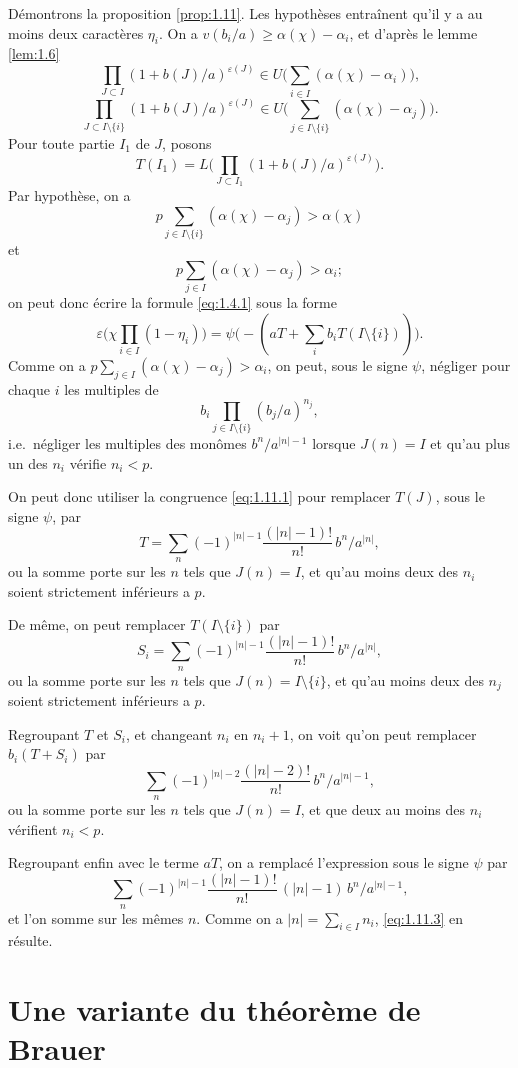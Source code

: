 \documentclass[12pt,a4paper]{article}
\theoremstyle{plain}
\theoremstyle{definition}
\theoremstyle{remark}
\begin{document}
D\'emontrons la proposition \ref{prop:1.11}. Les hypoth\`eses entra\^inent qu'il y a au moins deux caract\`eres $\eta_i$. On a $v(b_i/a) \geq \alpha(\chi) - \alpha_i$, et d'apr\`es le lemme \ref{lem:1.6}
\[
\prod_{J \subset I}(1+b(J)/a)^{\varepsilon(J)} \in U\biggl(\sum_{i \in I}(\alpha(\chi) - \alpha_i)\biggr),
\]
\[
\prod_{J \subset I \setminus \{i\}}(1+b(J)/a)^{\varepsilon(J)} \in U\biggl(\sum_{j \in I \setminus \{i\}}(\alpha(\chi) - \alpha_j)\biggr).
\]
Pour toute partie $I_1$ de $J$, posons
\[
T(I_1) = L\biggl(\prod_{J \subset I_1}(1+b(J)/a)^{\varepsilon(J)}\biggr).
\]
Par hypoth\`ese, on a
\[
p \sum_{j \in I \setminus \{i\}}(\alpha(\chi) - \alpha_j) > \alpha(\chi)
\]
et
\[
p \sum_{j \in I}(\alpha(\chi) - \alpha_j) > \alpha_i;
\]
on peut donc \'ecrire la formule \eqref{eq:1.4.1} sous la forme
\[
\varepsilon\biggl(\chi \prod_{i \in I}(1-\eta_i)\biggr) = \psi\bigl(-(aT + \sum_i b_i T(I \setminus \{i\}))\bigr).
\]
Comme on a $p \sum_{j \in I}(\alpha(\chi) - \alpha_j) > \alpha_i$, on peut, sous le signe $\psi$, n\'egliger pour chaque $i$ les multiples de
\[
b_i \prod_{j \in I \setminus \{i\}}(b_j/a)^{n_j},
\]
i.e.~n\'egliger les multiples des mon\^omes $b^n/a^{|n|-1}$ lorsque $J(n) = I$ et qu'au plus un des $n_i$ v\'erifie $n_i < p$.

On peut donc utiliser la congruence \eqref{eq:1.11.1} pour remplacer $T(J)$, sous le signe $\psi$, par
\[
T = \sum_n (-1)^{|n|-1} \frac{(|n|-1)!}{n!} \, b^n/a^{|n|},
\]
ou la somme porte sur les $n$ tels que $J(n) = I$, et qu'au moins deux des $n_i$ soient strictement inf\'erieurs a $p$.

De m\^eme, on peut remplacer $T(I \setminus \{i\})$ par
\[
S_i = \sum_n (-1)^{|n|-1} \frac{(|n|-1)!}{n!} \, b^n/a^{|n|},
\]
ou la somme porte sur les $n$ tels que $J(n) = I \setminus \{i\}$, et qu'au moins deux des $n_j$ soient strictement inf\'erieurs a $p$.

Regroupant $T$ et $S_i$, et changeant $n_i$ en $n_i + 1$, on voit qu'on peut remplacer $b_i(T + S_i)$ par
\[
\sum_n (-1)^{|n|-2} \frac{(|n|-2)!}{n!} \, b^n/a^{|n|-1},
\]
ou la somme porte sur les $n$ tels que $J(n) = I$, et que deux au moins des $n_i$ v\'erifient $n_i < p$.

Regroupant enfin avec le terme $aT$, on a remplac\'e l'expression sous le signe $\psi$ par
\[
\sum_n (-1)^{|n|-1} \frac{(|n|-1)!}{n!} \, (|n|-1) \, b^n/a^{|n|-1},
\]
et l'on somme sur les m\^emes $n$. Comme on a $|n| = \sum_{i \in I} n_i$, \eqref{eq:1.11.3} en r\'esulte.


\section{Une variante du th\'eor\`eme de Brauer}
\label{sec:2}
\end{document}

